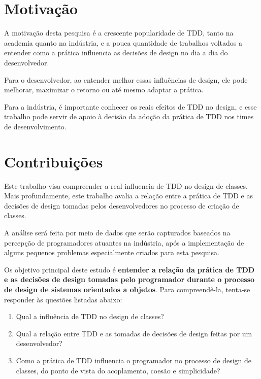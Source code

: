 \section{Motivação}

A motivação desta pesquisa é a crescente popularidade de TDD, tanto na
academia quanto na indústria, e a pouca quantidade de trabalhos
voltados a entender como a prática influencia as decisões de 
design no dia a dia do desenvolvedor.

Para o desenvolvedor, ao entender melhor essas influências de design, 
ele pode melhorar, maximizar o retorno ou até mesmo adaptar a prática.

Para a indústria, é importante conhecer os reais efeitos de TDD no design,
e esse trabalho pode servir de apoio à decisão da adoção da prática
de TDD nos times de desenvolvimento.

\section{Contribuições}

Este trabalho
visa compreender a real influencia de TDD no design de classes.
Mais profundamente, este trabalho avalia a relação entre a prática de 
TDD
e as decisões de design tomadas pelos desenvolvedores no processo de 
criação de classes.

A análise será feita por meio de dados que serão
capturados baseados na percepção de programadores atuantes na indústria, após
a implementação de alguns pequenos problemas especialmente criados para
esta pesquisa.

Os objetivo principal deste estudo é \textbf{entender a relação da prática de TDD 
e as decisões de design tomadas pelo programador durante o processo de 
design de sistemas orientados a objetos}.
Para compreendê-la, tenta-se responder às questões listadas
abaixo:

\begin{enumerate}

	\item Qual a influência de TDD no design de classes?

	\item Qual a relação entre TDD e as tomadas de decisões de design
	feitas por um desenvolvedor?

	\item Como a prática de TDD influencia o programador no processo de  
	design de classes, do ponto de vista do acoplamento, coesão e simplicidade?

\end{enumerate}

